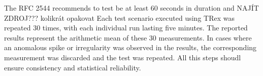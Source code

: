 The RFC 2544 recommends to test be at least 60 seconds in duration\cite{rfc2544} and NAJÍT ZDROJ??? kolikrát opakovat
Each test scenario executed using TRex was repeated 30 times, with each individual run lasting five minutes. 
The reported results represent the arithmetic mean of these 30 measurements. 
In cases where an anomalous spike or irregularity was observed in the results, the corresponding measurement was discarded and the test was repeated.  
All this steps shoudl ensure consistency and statistical reliability.




